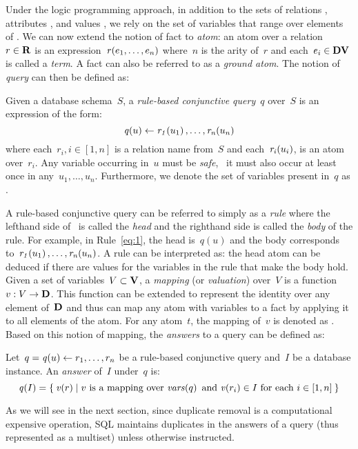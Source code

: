 Under the logic programming approach, in addition to the sets of relations \AR, attributes \AAs, and values \AD, we rely
on the set of variables \AV that range over elements of \AD.
%
We can now extend the notion of fact to \emph{atom}: an atom over a relation~$r \in \mathbf{R}$ is an
expression~$\mathit{r}\!\left(e_{1}, \dots, e_{n}\right)$ where~$n$ is the arity of~$r$ and each~$e_{i} \in \mathbf{DV}$ is called a
\emph{term}.  A fact can also be referred to as a \emph{ground atom}.  The notion of \emph{query} can then be defined
as:
%
\begin{definition}
  \label{def:rule-based-conjunctive-query}
  Given a database schema~$S$, a \emph{rule-based conjunctive query}~$q$ over~$S$ is an expression of the form:
  \begin{equation}
    \mathit{q}\!\left(u\right) \leftarrow \mathit{r_{1}}\!\left(u_{1}\right), \dots, \mathit{r_{n}}\!\left(u_{n}\right)\label{eq:1}
  \end{equation}
  where each~$r_{i}, i \in [1,n]$ is a relation name from~$S$ and each~$\mathit{r_{i}}\!\left(u_{i}\right)$, is an atom over~$r_{i}$.
  Any variable occurring in~$u$ must be \emph{safe}, \ie~it must also occur at least once in any~$u_{1}, \dots, u_{n}$.
  Furthermore, we denote the set of variables present in~$q$ as .
\end{definition}
%
\noindent A rule-based conjunctive query can be referred to simply as a \emph{rule} where the lefthand side
of~\character{$\leftarrow$} is called the \emph{head} and the righthand side is called the \emph{body} of the rule.  For
example, in Rule~\eqref{eq:1}, the head is~$q(u)$ and the body corresponds to~$\mathit{r_{1}}\!\left(u_{1}\right), \dots,
\mathit{r_{n}}\!\left(u_{n}\right)$.
% 
A rule can be interpreted as: the head atom can be deduced if there are values for the variables in the rule that make
the body hold.
%
Given a set of variables~$V \subset \mathbf{V}$, a \emph{mapping} (or \emph{valuation}) over~$V$ is a function~$v : V \to \mathbf{D}$.
This function can be extended to represent the identity over any element of~$\mathbf{D}$ and thus can map any atom with
variables to a fact by applying it to all elements of the atom.  For any atom~$t$, the mapping of~$v$ is denoted as
.
%
Based on this notion of mapping, the \emph{answers} to a query can be defined as:

\begin{definition}
  Let~$q = \mathit{q}\!\left(u\right) \leftarrow r_{1}, \dots, r_{n}$ be a rule-based conjunctive query and~$I$ be a database instance.
  An \emph{answer} of~$I$ under~$q$ is:
  \[
  \mathit{q}\!\left(I\right) = \left\{\: \mathit{v}\!\left(r\right) \mid v\mbox{ is a mapping over}~\mathit{vars}\!\left(q\right)~\mbox{and }\mathit{v}\!\left(r_i\right) \in I
  \mbox{ for each }i \in [1, n] \:\right\}
  \]
\end{definition}
%
As we will see in the next section, since duplicate removal is a computational expensive operation, \ac{SQL} maintains
duplicates in the answers of a query (thus represented as a multiset) unless otherwise instructed.

